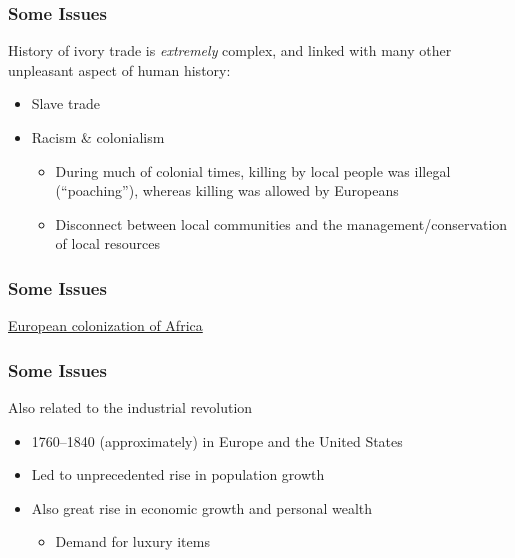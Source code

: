 \documentclass[10pt]{beamer}
\begin{document}
\begin{frame}[t]
\frametitle{Some Issues}
\vspace{0.5cm}

	History of ivory trade is \textcolor{myblue}{\emph{extremely}} complex, and linked with many other unpleasant aspect of human history:
	
	\medskip
	
	\begin{itemize}
		\item Slave trade
		\medskip
		\item Racism \& colonialism
			\smallskip
			\begin{itemize}
				\item During much of colonial times, killing by local people was illegal (``poaching''), whereas killing was allowed by Europeans
				\smallskip
				\item Disconnect between local communities and the management/conservation of local resources
			\end{itemize}
	\end{itemize}
\end{frame}


\begin{frame}
\frametitle{Some Issues}

	\begin{center}
		\href{https://www.youtube.com/watch?v=EKE92ucqBfc}{\Large{European colonization of Africa}}	
	\end{center}	
	
\end{frame}


\begin{frame}[t]
\frametitle{Some Issues}
\vspace{0.5cm}

	Also related to the \textcolor{myblue}{industrial revolution}\\
	
	\bigskip
	
	\begin{itemize}
		\item 1760--1840 (approximately) in Europe and the United States
		\medskip
		\item Led to unprecedented rise in population growth
		\medskip
		\item Also great rise in economic growth and personal wealth
			\smallskip
			\begin{itemize}
				\item Demand for luxury items
			\end{itemize}
	\end{itemize}
		
	
\end{frame}
\end{document}

